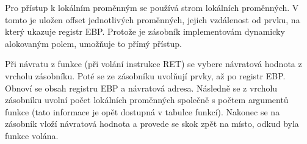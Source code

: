 \documentclass[a4paper,11pt,titlepage]{article}
\begin{document}
Pro přístup k lokálním proměnným se používá strom lokálních pro\-měn\-ných. V tomto je uložen offset jednotlivých proměnných, jejich vzdálenost od prvku, na který ukazuje registr EBP. Protože je zásobník implementovám dynamicky alokovaným polem, umožňuje to přímý přístup.


Při návratu z funkce (při volání instrukce RET) se vybere návratová hodnota z vrcholu zásobníku. Poté se ze zásobníku uvolňují prvky, až po registr EBP. Obnoví se obsah registru EBP a návratová adresa. Následně se z vrcholu zásobníku uvolní počet lokálních proměnných společně s počtem argumentů funkce (tato informace je opět dostupná v tabulce funkcí). Nakonec se na zásobník vloží návratová hodnota a provede se skok zpět na místo, odkud byla funkce volána.
\end{document}
